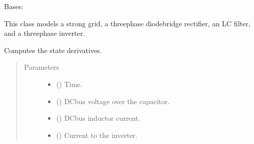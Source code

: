 \documentclass[letterpaper,10pt,english]{sphinxmanual}
\begin{document}
\begin{fulllineitems}
\label{\detokenize{model:model.converter.FrequencyConverter}}
\pysigstartsignatures
{}
\pysigstopsignatures
\sphinxAtStartPar
Bases: 

\sphinxAtStartPar
This class models a strong grid, a three\sphinxhyphen{}phase diode\sphinxhyphen{}bridge rectifier,
an LC filter, and a three\sphinxhyphen{}phase inverter.

\begin{fulllineitems}
\label{\detokenize{model:model.converter.FrequencyConverter.f}}
\pysigstartsignatures
{}
\pysigstopsignatures
\sphinxAtStartPar
Computes the state derivatives.
\begin{quote}\begin{description}
\item[{Parameters}] \leavevmode\begin{itemize}
\item {} 
\sphinxAtStartPar
{} () \textendash{} Time.

\item {} 
\sphinxAtStartPar
{} () \textendash{} DC\sphinxhyphen{}bus voltage over the capacitor.

\item {} 
\sphinxAtStartPar
{} () \textendash{} DC\sphinxhyphen{}bus inductor current.

\item {} 
\sphinxAtStartPar
{} () \textendash{} Current to the inverter.


\end{itemize}
\end{description}
\end{quote}
\end{fulllineitems}
\end{fulllineitems}
\end{document}
